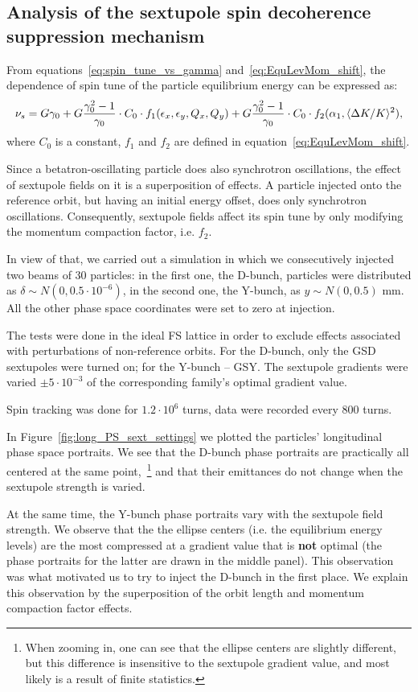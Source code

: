 \subsection{Analysis of the sextupole spin decoherence suppression mechanism}\label{sec:sext_decoh_suppression_effect_analysis}
From equations~\eqref{eq:spin_tune_vs_gamma} and~\eqref{eq:EquLevMom_shift}, the dependence of spin tune of the
particle equilibrium energy can be expressed as:
\[
\nu_s = G\gamma_0 + G\frac{\gamma_0^2-1}{\gamma_0}\cdot C_0\cdot f_1(\epsilon_x, \epsilon_y, Q_x, Q_y)+ G\frac{\gamma_0^2-1}{\gamma_0}\cdot C_0\cdot f_2(\alpha_1, \avg{\Delta K/K}^2),
\]
where $C_0$ is a constant, $f_1$ and $f_2$ are defined in equation~\eqref{eq:EquLevMom_shift}.

Since a betatron-oscillating particle does also synchrotron oscillations, the effect of sextupole fields on it
is a superposition of effects. A particle injected onto the reference orbit, but having an initial energy
offset, does only synchrotron oscillations. Consequently, sextupole fields affect its spin tune by only
modifying the momentum compaction factor, i.e. $f_2$.

In view of that, we carried out a simulation in which we consecutively injected two beams of 30 particles:
in the first one, the D-bunch, particles were distributed as $\delta\sim N(0, 0.5\cdot 10^{-6})$, 
in the second one, the Y-bunch, as $y\sim N(0, 0.5)$ mm. All the other phase space coordinates were 
set to zero at injection.

The tests were done in the ideal FS lattice in order to exclude effects associated with perturbations
of non-reference orbits. For the D-bunch, only the GSD sextupoles were turned on; for the Y-bunch -- GSY. The
sextupole gradients were varied $\pm 5\cdot 10^{-3}$ of the corresponding family's optimal gradient value.

Spin tracking was done for $1.2\cdot 10^6$ turns, data were recorded every 800 turns.

In Figure~\ref{fig:long_PS_sext_settings} we plotted the particles' longitudinal phase space portraits. 
We see that the D-bunch phase portraits are practically all centered at the same point,~\footnote{When zooming 	in, one can see that the ellipse centers are slightly different, but this difference is insensitive to
	the sextupole gradient value, and most likely is a result of finite statistics.} and that their 
emittances do not change when the sextupole strength is varied.

At the same time, the Y-bunch phase portraits vary with the sextupole field strength. We observe that the 
the ellipse centers (i.e. the equilibrium energy levels) are the most compressed at a gradient value that is
\textbf{not} optimal (the phase portraits for the latter are drawn in the middle panel). This observation
was what motivated us to try to inject the D-bunch in the first place. We explain this observation by the
superposition of the orbit length and momentum compaction factor effects.

